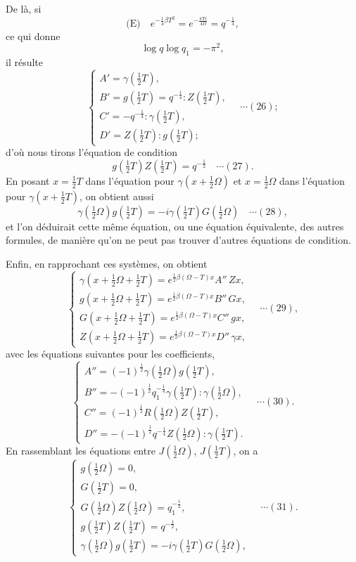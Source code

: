 \documentclass[12pt,a4paper]{article}
\begin{document}
\newpage
\setcounter{page}{169}

De l\`a, si
\[
\text{(E)}\quad e^{-\frac14\beta T^2} = e^{-\frac{\pi T i}{4\Omega}} = q^{-\frac14},
\]
ce qui donne
\[
\log q\log q_1 = -\pi^2,
\]
il r\'esulte
\[
\begin{cases}
A' = \gamma(\tfrac12 T),\\
B' = g(\tfrac12 T) = q^{-\frac14}\!:\!Z(\tfrac12 T),\\
C' = -q^{-\frac14}\!:\!\gamma(\tfrac12 T),\\
D' = Z(\tfrac12 T)\!:\!g(\tfrac12 T);
\end{cases}
\quad\cdots(26);
\]
d'o\`u nous tirons l'\'equation de condition
\[
g(\tfrac12 T)Z(\tfrac12 T) = q^{-\frac12} \quad\cdots(27).
\]
En posant $x = \tfrac12 T$ dans l'\'equation pour $\gamma(x + \tfrac12\Omega)$ et $x = \tfrac12\Omega$ dans l'\'equation pour $\gamma(x + \tfrac12 T)$, on obtient aussi
\[
\gamma(\tfrac12\Omega)g(\tfrac12 T) = -i\gamma(\tfrac12 T)G(\tfrac12\Omega) \quad\cdots(28),
\]
et l'on d\'eduirait cette m\^eme \'equation, ou une \'equation \'equivalente, des autres formules, de mani\`ere qu'on ne peut pas trouver d'autres \'equations de condition.

Enfin, en rapprochant ces syst\`emes, on obtient
\[
\begin{cases}
\gamma(x + \tfrac12\Omega + \tfrac12 T) = e^{\frac12\beta(\Omega - T)x}A''\,Zx,\\
g(x + \tfrac12\Omega + \tfrac12 T) = e^{\frac12\beta(\Omega - T)x}B''\,Gx,\\
G(x + \tfrac12\Omega + \tfrac12 T) = e^{\frac12\beta(\Omega - T)x}C''\,gx,\\
Z(x + \tfrac12\Omega + \tfrac12 T) = e^{\frac12\beta(\Omega - T)x}D''\,\gamma x,
\end{cases}
\quad\cdots(29),
\]
avec les \'equations suivantes pour les coefficients,
\[
\begin{cases}
A'' = (-1)^{\frac12}\gamma(\tfrac12\Omega)g(\tfrac12 T),\\
B'' = -(-1)^{\frac12}q_1^{-\frac14}\gamma(\tfrac12 T)\!:\!\gamma(\tfrac12\Omega),\\
C'' = (-1)^{\frac12}R(\tfrac12\Omega)Z(\tfrac12 T),\\
D'' = -(-1)^{\frac12}q^{-\frac14}Z(\tfrac12\Omega)\!:\!\gamma(\tfrac12 T).
\end{cases}
\quad\cdots(30).
\]
En rassemblant les \'equations entre $J(\tfrac12\Omega)$, $J(\tfrac12 T)$, on a
\[
\begin{cases}
g(\tfrac12\Omega) = 0,\\
G(\tfrac12 T) = 0,\\
G(\tfrac12\Omega)Z(\tfrac12\Omega) = q_1^{-\frac12},\\
g(\tfrac12 T)Z(\tfrac12 T) = q^{-\frac12},\\
\gamma(\tfrac12\Omega)g(\tfrac12 T) = -i\gamma(\tfrac12 T)G(\tfrac12\Omega),
\end{cases}
\quad\cdots(31).
\]
\end{document}
